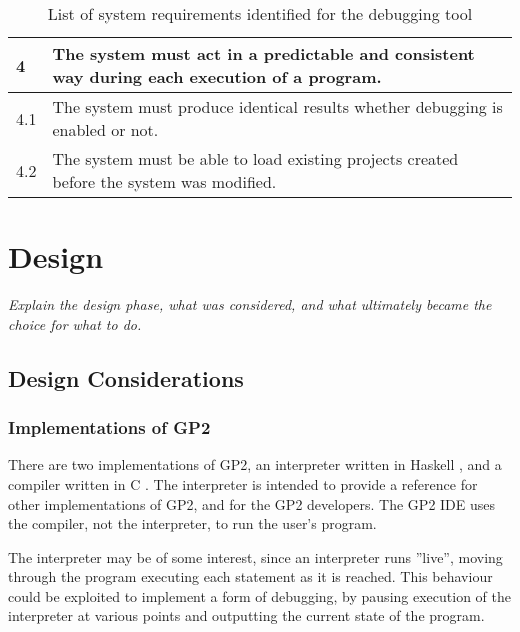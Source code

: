 \documentclass[authoryearcitations]{UoYCSproject}
\begin{document}
\begin{table}[tbp]
\begin{tabularx}{\linewidth}{|l|X|}
        4    &  The system must act in a predictable and consistent way during
                each execution of a program. \\ \hline
        4.1  &  The system must produce identical results whether debugging is
                enabled or not. \\ \hline
        4.2  &  The system must be able to load existing projects created before
                the system was modified. \\ \hline
    \end{tabularx}
    \caption{List of system requirements identified for the debugging tool}
    \label{tab:SystemRequirements}
\end{table}

\clearpage


\chapter{Design}
\label{cha:Design}

\emph{Explain the design phase, what was considered, and what ultimately 
became the choice for what to do.}


\section{Design Considerations}

\subsection{Implementations of GP2}
\label{sec:ImplementationsOfGP2}

There are two implementations of GP2, an interpreter written in Haskell
\citep[ch. 5.3]{bak2015}, and a compiler written in C \citep[ch. 5.5]{bak2015}.
The interpreter is intended to provide a reference for other implementations of
GP2, and for the GP2 developers. The GP2 IDE uses the compiler, not the
interpreter, to run the user's program.

The interpreter may be of some interest, since an interpreter runs ''live'',
moving through the program executing each statement as it is reached. This
behaviour could be exploited to implement a form of debugging, by pausing
execution of the interpreter at various points and outputting the current state
of the program.
\end{document}
